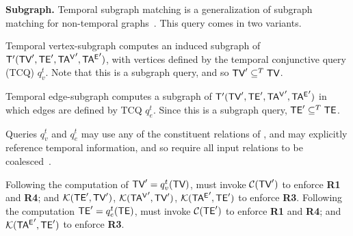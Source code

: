 
{\bf Subgraph.} Temporal subgraph matching is a generalization of
subgraph matching for non-temporal graphs~\cite{Wood2012}.  This query
comes in two variants.


Temporal vertex-subgraph  computes an induced
subgraph of \tve $\mathsf{T}'(\textsf{TV}', \textsf{TE}', \mathsf{TA^{V}}', \mathsf{TA^{E}}')$, with vertices
defined by the temporal conjunctive query (TCQ) $q^t_v$.  Note that
this is a subgraph query, and so $\textsf{TV}' \subseteq^T \textsf{TV}$.


Temporal edge-subgraph  computes a subgraph of \ttt
$\mathsf{T}'(\textsf{TV}', \textsf{TE}', \mathsf{TA^{V}}', \mathsf{TA^{E}}')$ in which edges are defined by TCQ
$q^t_e$.  Since this is a subgraph query, $\textsf{TE}' \subseteq^T \textsf{TE}$.

Queries $q^t_v$ and $q^t_e$ may use any of the constituent relations
of \tve, and may explicitly reference temporal information, and so
require all input relations to be
coalesced~\cite{DBLP:reference/db/Bohlen09}.

Following the computation of $\textsf{TV}' = q^t_v(\textsf{TV})$, 
must invoke $\mathcal{C}(\textsf{TV}')$ to enforce {\bf R1} and {\bf R4}; and
$\mathcal{K}(\textsf{TE}',\textsf{TV}')$, $\mathcal{K}(\mathsf{TA^{V}}',\textsf{TV}')$, $\mathcal{K}(\mathsf{TA^{E}}',\textsf{TE}')$
to enforce {\bf R3}.
%
Following the computation $\textsf{TE}' = q^t_e(\textsf{TE})$,  must
invoke $\mathcal{C}(\textsf{TE}')$ to enforce {\bf R1} and {\bf R4}; and
$\mathcal{K}(\mathsf{TA^{E}}',\textsf{TE}')$ to enforce {\bf R3}.  %


